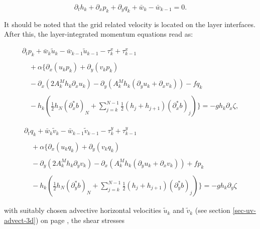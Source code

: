 \begin{equation}\label{ContiLayerInt}
\partial_t h_k + \partial_x p_k + \partial_y q_k + \bar w_k - \bar w_{k-1}=0.
\end{equation}

It should be noted that the grid related velocity is located on the 
layer interfaces. 
After this, the layer-integrated momentum equations read as:

\begin{equation}\label{uEqvi}
\begin{array}{l}
\partial_t p_k 
+\bar w_k \tilde u_k -\bar w_{k-1} \tilde u_{k-1} 
-\tau^x_k + \tau^x_{k-1} 
\\ \\ \quad
+\alpha\Bigg\{\partial_x(u_kp_k)+\partial_y(v_kp_k)
\\ \\ \displaystyle \quad 
-\partial_x\left(2A_k^Mh_k\partial_xu_k\right)-\partial_y\left(A_k^Mh_k
(\partial_yu_k+\partial_xv_k)\right)
- fq_k 
\\ \\ \quad
\displaystyle
-h_k\left(
\frac12h_N(\partial^*_xb)_N
+\sum_{j=k}^{N-1}\frac12(h_j+h_{j+1})(\partial^*_xb)_j
\right)\Bigg\}
=
-gh_k\partial_x\zeta,
\end{array}
\end{equation}

\begin{equation}\label{vEqvi}
\begin{array}{l}
\partial_t q_k 
+\bar w_k  \tilde v_k -\bar w_{k-1}  \tilde v_{k-1} 
-\tau^y_k + \tau^y_{k-1} 
\\ \\ \quad
+\alpha\Bigg\{\partial_x(u_kq_k)+\partial_y(v_kq_k)
\\ \\ \displaystyle \quad 
-\partial_y\left(2A_k^Mh_k\partial_yv_k\right)-\partial_x\left(A_k^Mh_k
(\partial_yu_k+\partial_xv_k)\right)
+ fp_k 
\\ \\ \quad
\displaystyle
-h_k\left(
\frac12h_N(\partial^*_yb)_N
+\sum_{j=k}^{N-1}\frac12(h_j+h_{j+1})(\partial^*_yb)_j
\right)\Bigg\}
=
-gh_k\partial_y\zeta
\end{array}
\end{equation}

with suitably chosen advective horizontal 
velocities $\tilde u_k$ and $\tilde v_k$
(see section \ref{sec-uv-advect-3d}) on page \pageref{sec-uv-advect-3d}, 
the shear stresses

